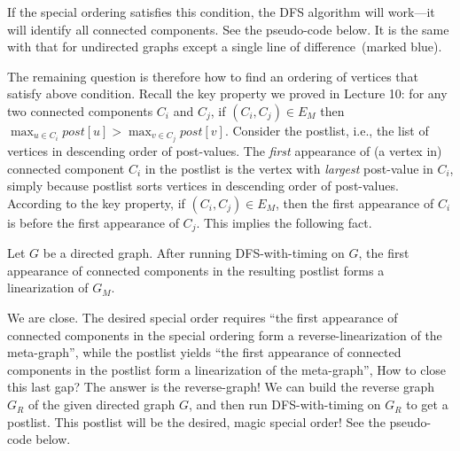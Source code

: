 If the special ordering satisfies this condition, the DFS algorithm will
work---it will identify all connected components. See the pseudo-code below. 
It is the same with that for undirected graphs 
except a single line of difference~(marked blue).

\begin{minipage}{0.8\textwidth}
	\xxx
	\xxx
	\xxx
	\xxx
	\xxx
	\xxx
	\xxx
	\xxx
	\xxx
\end{minipage}

\begin{minipage}{0.8\textwidth}
	\xxx
	\xxx
	\xxx
	\xxx
	\xxx
	\xxx
\end{minipage}


The remaining question is therefore how to find an ordering of vertices that satisfy above condition.
Recall the key property we proved in Lecture 10: for any two connected components $C_i$ and $C_j$, if $(C_i, C_j) \in E_M$ then
$\max_{u\in C_i} post[u] > \max_{v\in C_j} post[v]$.
Consider the postlist, i.e., the list of vertices in descending order of post-values.
The \emph{first} appearance of (a vertex in) connected component $C_i$ in the postlist
is the vertex with \emph{largest} post-value in $C_i$, simply because postlist sorts vertices in descending order of post-values.
According to the key property, if $(C_i, C_j)\in E_M$, then the first appearance of $C_i$ is before the first appearance of $C_j$.
This implies the following fact.
\begin{claim}
Let $G$ be a directed graph. After running DFS-with-timing on $G$,
the first appearance of connected components in the resulting postlist forms a linearization of $G_M$.
\end{claim}

We are close. The desired special order requires 
``the first appearance of connected components in the special ordering form a reverse-linearization of the meta-graph'',
while the postlist yields 
``the first appearance of connected components in the postlist form a linearization of the meta-graph'',
How to close this last gap? The answer is the reverse-graph!
We can build the reverse graph $G_R$ of the given directed graph $G$,
and then run DFS-with-timing on $G_R$ to get a postlist.
This postlist will be the desired, magic special order!
See the pseudo-code below.


